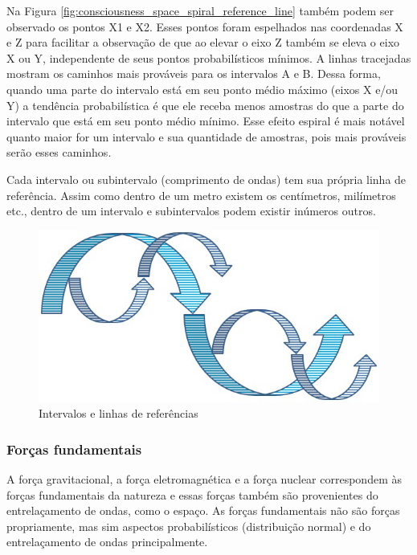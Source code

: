 Na Figura \ref{fig:consciousness_space_spiral_reference_line} também podem ser observado os pontos X1 e X2. Esses pontos foram espelhados nas coordenadas X e Z para facilitar a observação de que ao elevar o eixo Z também se eleva o eixo X ou Y, independente de seus pontos probabilísticos mínimos. A linhas tracejadas mostram os caminhos mais prováveis para os intervalos A e B. Dessa forma, quando uma parte do intervalo está em seu ponto médio máximo (eixos X e/ou Y) a tendência probabilística é que ele receba menos amostras do que a parte do intervalo que está em seu ponto médio mínimo. Esse efeito espiral é mais notável quanto maior for um intervalo e sua quantidade de amostras, pois mais prováveis serão esses caminhos.

Cada intervalo ou subintervalo (comprimento de ondas) tem sua própria linha de referência. Assim como dentro de um metro existem os centímetros, milímetros etc., dentro de um intervalo e subintervalos podem existir inúmeros outros.
	\begin{figure}[H]
	\caption{Intervalos e linhas de referências}
	\label{fig:consciousness_space_spiral_underlines}
	\centering
	\includegraphics[scale=.5]{sections/images/consciousness_space_spiral_underlines.jpg}
	\end{figure}

\subsubsection{Forças fundamentais}
A força gravitacional, a força eletromagnética e a força nuclear correspondem às forças fundamentais da natureza e essas forças também são provenientes do entrelaçamento de ondas, como o espaço. As forças fundamentais não são forças propriamente, mas sim aspectos probabilísticos (distribuição normal) e do entrelaçamento de ondas principalmente.

